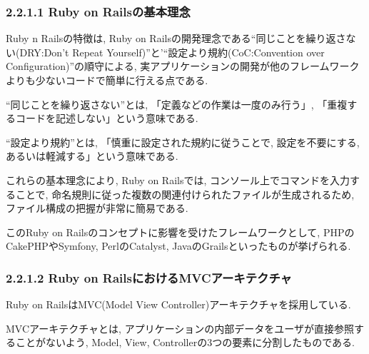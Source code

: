 \subsubsection{2.2.1.1 Ruby on Railsの基本理念}
Ruby n Railsの特徴は, Ruby on Railsの開発理念である“同じことを繰り返さない(DRY:Don't Repeat Yourself)”と'“設定より規約(CoC:Convention over Configuration)”の順守による, 実アプリケーションの開発が他のフレームワークよりも少ないコードで簡単に行える点である.

“同じことを繰り返さない”とは, 「定義などの作業は一度のみ行う」, 「重複するコードを記述しない」という意味である.

“設定より規約”とは, 「慎重に設定された規約に従うことで, 設定を不要にする, あるいは軽減する」という意味である.

これらの基本理念により, Ruby on Railsでは, コンソール上でコマンドを入力することで, 命名規則に従った複数の関連付けられたファイルが生成されるため, ファイル構成の把握が非常に簡易である.

このRuby on Railsのコンセプトに影響を受けたフレームワークとして, PHPのCakePHPやSymfony, PerlのCatalyst, JavaのGrailsといったものが挙げられる.

\subsubsection{2.2.1.2 Ruby on RailsにおけるMVCアーキテクチャ}
Ruby on RailsはMVC(Model View Controller)アーキテクチャを採用している.

MVCアーキテクチャとは, アプリケーションの内部データをユーザが直接参照することがないよう, Model, View, Controllerの3つの要素に分割したものである.

